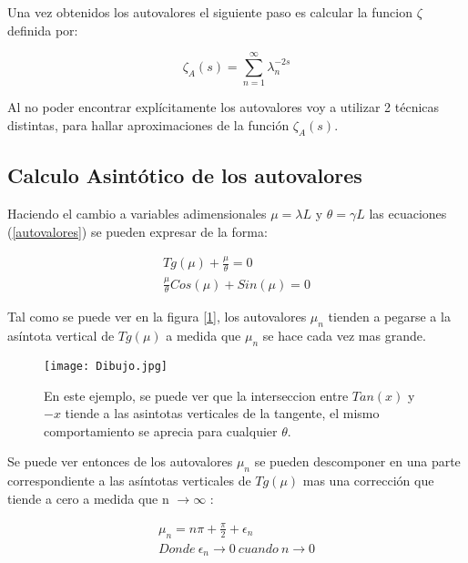 Una vez obtenidos los autovalores el siguiente paso es calcular la funcion $\zeta$ definida por:

\begin{equation}
    \zeta _ {A } (s) = \sum_{n = 1} ^{ \infty } \lambda _n ^ {-2 s}
\end{equation}

Al no poder encontrar explícitamente los autovalores voy a utilizar 2 técnicas distintas, para hallar aproximaciones de la función $\zeta _A (s)$.

\subsection{Calculo Asintótico de los autovalores}


Haciendo el cambio a variables adimensionales $\mu = \lambda L $ y $\theta = \gamma L $ las ecuaciones (\ref{autovalores}) se pueden expresar de la forma:

\begin{equation}
\begin{array}{c}
    Tg(\mu) + \frac{\mu}{\theta} = 0 \\
    \frac{\mu}{\theta} Cos( \mu ) + Sin( \mu ) = 0
\end{array}
\label{eq.asintota}
\end{equation}

Tal como se puede ver en la figura [\ref{fig:Dibujo}], los autovalores $\mu _n$ tienden a pegarse a la asíntota vertical de $ Tg ( \mu ) $ a medida que $\mu _n$ se hace cada vez mas grande.

\begin{figure}
    \centering
    \texttt{[image: Dibujo.jpg]}
    \caption{En este ejemplo, se puede ver que la interseccion entre $Tan(x)$ y $-x$ tiende a las asintotas verticales de la tangente, el mismo comportamiento se aprecia para cualquier $ \theta $.}
    \label{fig:Dibujo}
\end{figure}

Se puede ver entonces de los autovalores $\mu _n$ se pueden descomponer en una parte correspondiente a las asíntotas verticales de $Tg( \mu )$ mas una corrección que tiende a cero a medida que n  $ \rightarrow \infty$ :

\begin{equation}
\begin{array}{c}
    \mu _n = n \pi + \frac{\pi}{2} + \epsilon _n \\
    Donde \ \epsilon _n \rightarrow{0}  \ cuando \ n \rightarrow{0}
\end{array}
\label{eq.mu}
\end{equation}


